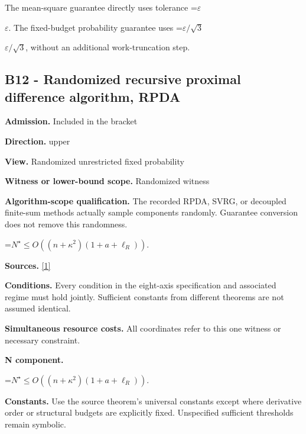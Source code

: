 \documentclass[10pt,a4paper]{article}
\newcommand{\AtlasMath}[1]{\par\begingroup\centering\setbox0=\hbox{$\displaystyle #1$}\ifdim\wd0>1.4\linewidth\typeout{ATLAS WIDE FORMULA: \the\wd0}\fi\ifdim\wd0>\linewidth\resizebox{\linewidth}{!}{\box0}\else\box0\fi\par\endgroup}
\newcommand{\AtlasInlineMath}[1]{\begingroup\setbox0=\hbox{$#1$}\ifdim\wd0>.4\linewidth\endgroup\AtlasMath{#1}\else\endgroup$#1$\fi}
\begin{document}
The mean-square guarantee directly uses tolerance \AtlasInlineMath{\varepsilon}. The fixed-budget probability guarantee uses \AtlasInlineMath{\varepsilon/\sqrt3}, without an additional work-truncation step.



\subsection{B12 - Randomized recursive proximal difference algorithm, RPDA}


\textbf{Admission.} Included in the bracket



\textbf{Direction.} upper



\textbf{View.} Randomized unrestricted fixed probability



\textbf{Witness or lower-bound scope.} Randomized witness



\textbf{Algorithm-scope qualification.} The recorded RPDA, SVRG, or decoupled finite-sum methods actually sample components randomly. Guarantee conversion does not remove this randomness.



\AtlasMath{N^\star\le O\!\left((n+\kappa^2)(1+a+\ell_R)\right).}


\textbf{Sources.} \href{https://arxiv.org/pdf/2610.04944v1}{[1]}



\textbf{Conditions.} Every condition in the eight-axis specification and associated regime must hold jointly. Sufficient constants from different theorems are not assumed identical.



\textbf{Simultaneous resource costs.} All coordinates refer to this one witness or necessary constraint.



\textbf{N component.}



\AtlasMath{N^\star\le O\!\left((n+\kappa^2)(1+a+\ell_R)\right).}


\textbf{Constants.} Use the source theorem’s universal constants except where derivative order or structural budgets are explicitly fixed. Unspecified sufficient thresholds remain symbolic.
\end{document}
